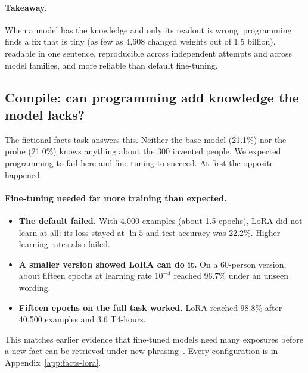 \paragraph{Takeaway.} When a model has the knowledge and only its readout is wrong, programming finds a fix that is tiny (as few as 4,608 changed weights out of 1.5 billion), readable in one sentence, reproducible across independent attempts and across model families, and more reliable than default fine-tuning.

\begin{table}[t]
\centering\small

\caption{How reliable LoRA is, and how much data it needs (Qwen, test accuracy, \%). Seeds use the default configuration (4,000 examples, 250 optimizer steps). The learning curve keeps 250 optimizer steps but draws them from only $n$ distinct training examples (seed 0). The last column is the range over all programmed edits for the task.}
\label{tab:reliability}
\end{table}

\subsection{Compile: can programming add knowledge the model lacks?}
\label{sec:compile}
The fictional facts task answers this. Neither the base model (21.1\%) nor the probe (21.0\%) knows anything about the 300 invented people. We expected programming to fail here and fine-tuning to succeed. At first the opposite happened.

\paragraph{Fine-tuning needed far more training than expected.}
\begin{itemize}
  \item \textbf{The default failed.} With 4,000 examples (about 1.5 epochs), LoRA did not learn at all: its loss stayed at $\ln 5$ and test accuracy was 22.2\%. Higher learning rates also failed.
  \item \textbf{A smaller version showed LoRA can do it.} On a 60-person version, about fifteen epochs at learning rate $10^{-4}$ reached 96.7\% under an unseen wording.
  \item \textbf{Fifteen epochs on the full task worked.} LoRA reached 98.8\% after 40,500 examples and 3.6 T4-hours.
\end{itemize}
This matches earlier evidence that fine-tuned models need many exposures before a new fact can be retrieved under new phrasing~\citep{allenzhu2023physics}. Every configuration is in Appendix~\ref{app:facts-lora}.

